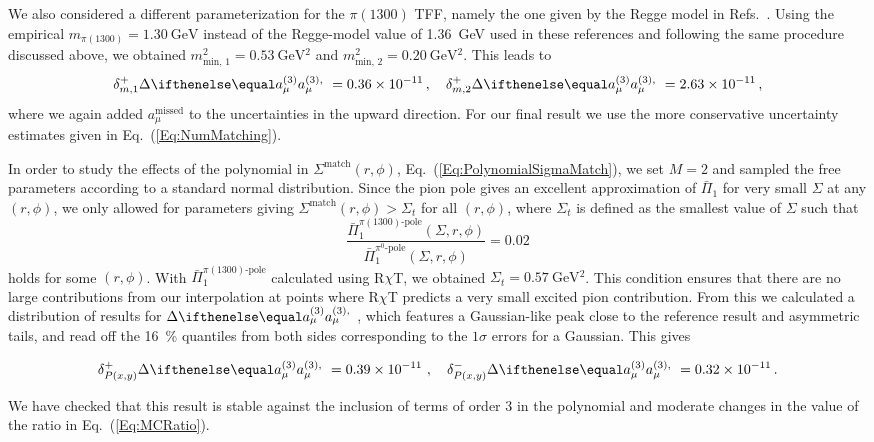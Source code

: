 We also considered a different parameterization for the $\pi(1300)$ TFF, namely the one given by the Regge model in Refs.~\cite{BernSDCShort,BernSDCLong}. Using the empirical $m_{\pi(1300)} = \SI{1.30}{\GeV}$ instead of the Regge-model value of \SI{1.36}{\GeV} used in these references and following the same procedure discussed above, we obtained $m_\text{min, 1}^2 = \SI{0.53}{\GeV^2}$ and $m_\text{min, 2}^2 = \SI{0.20}{\GeV^2}$. This leads to
\begin{equation}
\delta_{m, 1}^+ \Delta \aPion = \num{0.36e-11}\, ,\quad \delta_{m, 2}^+ \Delta \aPion = \num{2.63e-11}\,,
\end{equation}
where we again added $a_\mu^\text{missed}$ to the uncertainties in the upward direction. For our final result we use the more conservative uncertainty estimates given in Eq.~(\ref{Eq:NumMatching}).

In order to study the effects of the polynomial in $\Sigma^\text{match}(r,\phi)$, Eq.~(\ref{Eq:PolynomialSigmaMatch}), we set $M=2$ and sampled the free parameters according to a standard normal distribution. Since the pion pole gives an excellent approximation of $\bar{\Pi}_1$ for very small $\Sigma$ at any $(r,\phi)$, we only allowed for parameters giving $\Sigma^\text{match}(r,\phi)>\Sigma_t$ for all $(r,\phi)$, where $\Sigma_t$ is defined as the smallest value of $\Sigma$ such that
\begin{equation}
\frac{\bar{\Pi}_1^\text{$\pi(1300)$-pole}(\Sigma,r,\phi)}{\bar{\Pi}_1^\text{$\pi^0$-pole}(\Sigma,r,\phi)} = 0.02
\label{Eq:MCRatio}
\end{equation}
holds for some $(r,\phi)$. With $\bar{\Pi}_1^\text{$\pi(1300)$-pole}$ calculated using R$\chi$T, we obtained $\Sigma_t = \SI{0.57}{\GeV^2}$. This condition ensures that there are no large contributions from our interpolation at points where R$\chi$T predicts a very small excited pion contribution. From this we calculated a distribution of results for $\Delta \aPion$, which features a Gaussian-like peak close to the reference result and asymmetric tails, and read off the \SI{16}{\percent} quantiles from both sides corresponding to the $1\sigma$ errors for a Gaussian. This gives
\begin{minipage}{\columnwidth}
\begin{equation}
\delta_{P(x,y)}^+ \Delta \aPion = \num{0.39 e-11}\ ,\quad \delta_{P(x,y)}^- \Delta \aPion = \num{0.32 e-11}\,.
\end{equation}
\end{minipage}
We have checked that this result is stable against the inclusion of terms of order 3 in the polynomial and moderate changes in the value of the ratio in Eq.~(\ref{Eq:MCRatio}).

